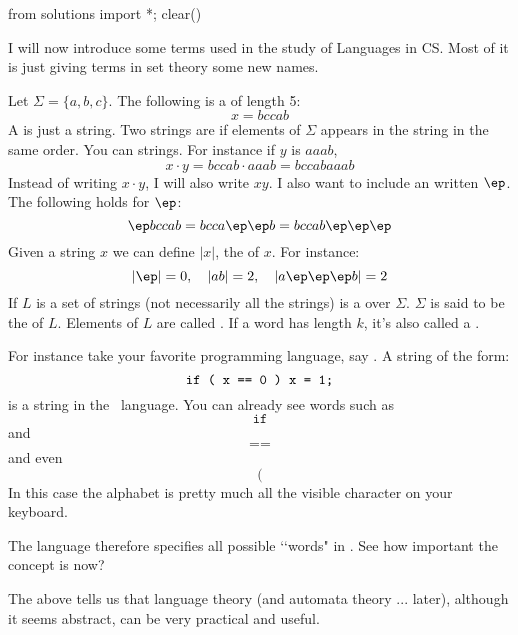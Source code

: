 \begin{python0}
from solutions import *; clear()
\end{python0}

I will now introduce some terms used in the study of Languages in
CS. Most of it is just giving terms in set theory some new names.

Let $\Sigma = \{a,b,c\}$. The following is a  of
length 5:
\[ x = bccab \]
A  is just a string.
Two strings are  if elements of $\Sigma$ appears in the
string in the same order. You can  strings.
For
instance if $y$ is $aaab$,
\[
x \cdot y = bccab \cdot aaab = bccabaaab
\]
Instead of writing $x \cdot y$, I will also write $xy$. 
I also want to include an  written $\ep$.
The following
holds for $\ep$:
\[ \ep bccab = bcca\ep\ep b = bccab\ep\ep\ep \]
Given a string $x$ we can define $|x|$, the  of $x$.
For instance:
\[
  |\ep| = 0, \quad |ab| = 2, \quad |a\ep\ep\ep b| = 2
\]
If $L$ is a set of strings (not necessarily all the strings) is a
 over $\Sigma$. $\Sigma$ is said to be the
 of
$L$.
Elements of $L$ are called .
If a word has
length $k$, it's also called a .

For instance take your favorite programming language, say \cpp. A
string of the form:
\[
\text{\texttt{ if ( x == 0 ) x = 1; }}
\]
is a string in the \cpp\ language.
You can already see words such as
\[
\texttt{if}
\]
and
\[
\texttt{==}
\]
and even
\[
\texttt{(}
\]
In this case the alphabet is pretty much all the
visible character on your keyboard.

The language therefore specifies all possible \lq\lq words" in
\cpp.
See how important the concept is now?

The above tells us that language theory (and automata theory ... later),
although it seems abstract, can be very practical and useful.


